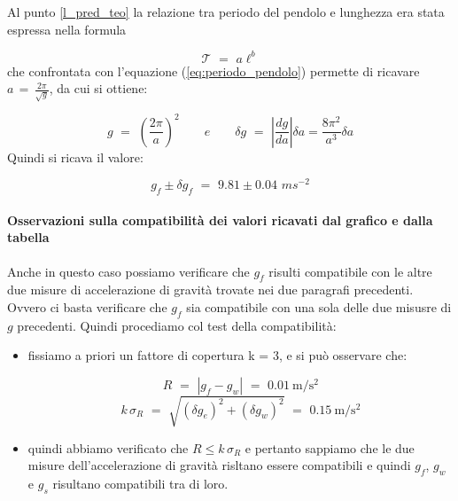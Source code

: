 Al punto \ref{l_pred_teo} la relazione tra periodo del pendolo e lunghezza era stata espressa nella formula

\begin{equation*}
\mathcal{T} \,\, = \,\, a\ell^b
\end{equation*}
%
che confrontata con l'equazione (\ref{eq:periodo_pendolo}) permette di ricavare $a \, = \, \frac{2 \pi}{\sqrt{g}}$, da cui si ottiene:

\begin{equation*}
g \,\, = \,\, \left( \frac{2 \pi}{a}\right)^2 \quad\quad e \quad\quad \delta g \,\, = \,\, \left| \frac{dg}{da} \right|  \delta a = \frac{8 \pi^2}{a^3} \delta a
\end{equation*}
%
Quindi si ricava il valore:

\begin{equation}
g_f \pm \delta g_f \,\, = \,\, 9.81 \pm 0.04 \,\, ms^{-2}
\end{equation}

\paragraph{Osservazioni sulla compatibilità dei valori ricavati dal grafico e dalla tabella}

Anche in questo caso possiamo verificare che $g_f$ risulti compatibile con le altre due misure di accelerazione di gravità trovate nei due paragrafi precedenti. Ovvero ci basta verificare che $g_f$ sia compatibile con una sola delle due misusre di $g$ precedenti. Quindi procediamo col test della compatibilità:
\begin{itemize}
	\item{fissiamo a priori un fattore di copertura k = 3, e si può osservare che:
	
		\begin{equation*}
			R \,\, = \,\, |g_f - g_w| \,\, = \,\, \SI{0.01}{\metre\per\square\second}
		\end{equation*}
		\begin{equation*}
			k\,\sigma_R \,\, = \,\, \sqrt{(\delta g_e)^2 + (\delta g_w)^2} \,\, = \,\, \SI{0.15}{\metre\per\square\second}
		\end{equation*}
		}
	\item{quindi abbiamo verificato che $R \leq k\,\sigma_R$ e pertanto sappiamo che le due misure dell'accelerazione di gravità risltano essere compatibili e quindi $g_f$, $g_w$ e $g_s$ risultano compatibili tra di loro.}
\end{itemize}